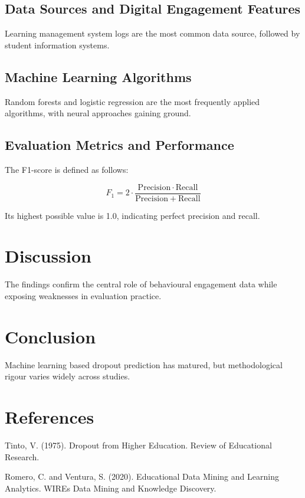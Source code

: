 \documentclass[12pt]{article}
\begin{document}
\subsection{Data Sources and Digital Engagement Features}

Learning management system logs are the most common data source, followed by student information systems.

\subsection{Machine Learning Algorithms}

Random forests and logistic regression are the most frequently applied algorithms, with neural approaches gaining ground.

\subsection{Evaluation Metrics and Performance}

The F1-score is defined as follows:

\begin{equation}
F_1 = 2 \cdot \frac{\mathrm{Precision} \cdot \mathrm{Recall}}{\mathrm{Precision} + \mathrm{Recall}}
\label{eq:f1}
\end{equation}

Its highest possible value is 1.0, indicating perfect precision and recall.

\section{Discussion}

The findings confirm the central role of behavioural engagement data while exposing weaknesses in evaluation practice.

\section{Conclusion}

Machine learning based dropout prediction has matured, but methodological rigour varies widely across studies.

\section{References}

Tinto, V. (1975). Dropout from Higher Education. Review of Educational Research.

Romero, C. and Ventura, S. (2020). Educational Data Mining and Learning Analytics. WIREs Data Mining and Knowledge Discovery.
\end{document}
